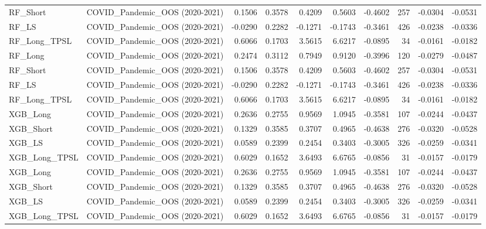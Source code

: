 \begin{tabular}{llrrrrrrrr}
\cline{1-10}
RF\_Short & COVID\_Pandemic\_OOS (2020-2021) & 0.1506 & 0.3578 & 0.4209 & 0.5603 & -0.4602 & 257 & -0.0304 & -0.0531 \\
\cline{1-10}
RF\_LS & COVID\_Pandemic\_OOS (2020-2021) & -0.0290 & 0.2282 & -0.1271 & -0.1743 & -0.3461 & 426 & -0.0238 & -0.0336 \\
\cline{1-10}
RF\_Long\_TPSL & COVID\_Pandemic\_OOS (2020-2021) & 0.6066 & 0.1703 & 3.5615 & 6.6217 & -0.0895 & 34 & -0.0161 & -0.0182 \\
\cline{1-10}
RF\_Long & COVID\_Pandemic\_OOS (2020-2021) & 0.2474 & 0.3112 & 0.7949 & 0.9120 & -0.3996 & 120 & -0.0279 & -0.0487 \\
\cline{1-10}
RF\_Short & COVID\_Pandemic\_OOS (2020-2021) & 0.1506 & 0.3578 & 0.4209 & 0.5603 & -0.4602 & 257 & -0.0304 & -0.0531 \\
\cline{1-10}
RF\_LS & COVID\_Pandemic\_OOS (2020-2021) & -0.0290 & 0.2282 & -0.1271 & -0.1743 & -0.3461 & 426 & -0.0238 & -0.0336 \\
\cline{1-10}
RF\_Long\_TPSL & COVID\_Pandemic\_OOS (2020-2021) & 0.6066 & 0.1703 & 3.5615 & 6.6217 & -0.0895 & 34 & -0.0161 & -0.0182 \\
\cline{1-10}
XGB\_Long & COVID\_Pandemic\_OOS (2020-2021) & 0.2636 & 0.2755 & 0.9569 & 1.0945 & -0.3581 & 107 & -0.0244 & -0.0437 \\
\cline{1-10}
XGB\_Short & COVID\_Pandemic\_OOS (2020-2021) & 0.1329 & 0.3585 & 0.3707 & 0.4965 & -0.4638 & 276 & -0.0320 & -0.0528 \\
\cline{1-10}
XGB\_LS & COVID\_Pandemic\_OOS (2020-2021) & 0.0589 & 0.2399 & 0.2454 & 0.3403 & -0.3005 & 326 & -0.0259 & -0.0341 \\
\cline{1-10}
XGB\_Long\_TPSL & COVID\_Pandemic\_OOS (2020-2021) & 0.6029 & 0.1652 & 3.6493 & 6.6765 & -0.0856 & 31 & -0.0157 & -0.0179 \\
\cline{1-10}
XGB\_Long & COVID\_Pandemic\_OOS (2020-2021) & 0.2636 & 0.2755 & 0.9569 & 1.0945 & -0.3581 & 107 & -0.0244 & -0.0437 \\
\cline{1-10}
XGB\_Short & COVID\_Pandemic\_OOS (2020-2021) & 0.1329 & 0.3585 & 0.3707 & 0.4965 & -0.4638 & 276 & -0.0320 & -0.0528 \\
\cline{1-10}
XGB\_LS & COVID\_Pandemic\_OOS (2020-2021) & 0.0589 & 0.2399 & 0.2454 & 0.3403 & -0.3005 & 326 & -0.0259 & -0.0341 \\
\cline{1-10}
XGB\_Long\_TPSL & COVID\_Pandemic\_OOS (2020-2021) & 0.6029 & 0.1652 & 3.6493 & 6.6765 & -0.0856 & 31 & -0.0157 & -0.0179 \\

\end{tabular}
